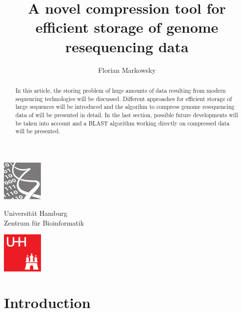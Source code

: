 \documentclass[acmtocl,acmnow]{article}
\title{A novel compression tool for efficient storage of genome resequencing data}
\author{Florian Markowsky}
\begin{document}
 

\maketitle
\begin{minipage}{3cm}
  \begin{center}
    \includegraphics[width=2cm]{img/ZBH_Logo_Neu.pdf}
  \end{center}
\end{minipage}
\begin{minipage}{6cm}
  Universität Hamburg\\
  Zentrum für Bioinformatik
\end{minipage}
\begin{minipage}{3cm}
  \begin{center}
    \includegraphics[width=2cm]{img/UHH_Logo.pdf}
  \end{center}
\end{minipage}

\begin{abstract} 
  In this article, the storing problem of huge amounts of data resulting from modern sequencing technologies will be 
  discussed. Different approaches for efficient storage of large sequences will be introduced and the algorihm to
  compress genome resequencing data of \cite{WaZh} will be presented in detail. In the last section, possible
  future developments will be taken into account and a BLAST algorithm working directly on compressed data will be 
  presented.
\end{abstract}           

  
\tableofcontents

\newpage

\section{Introduction}
\end{document}
